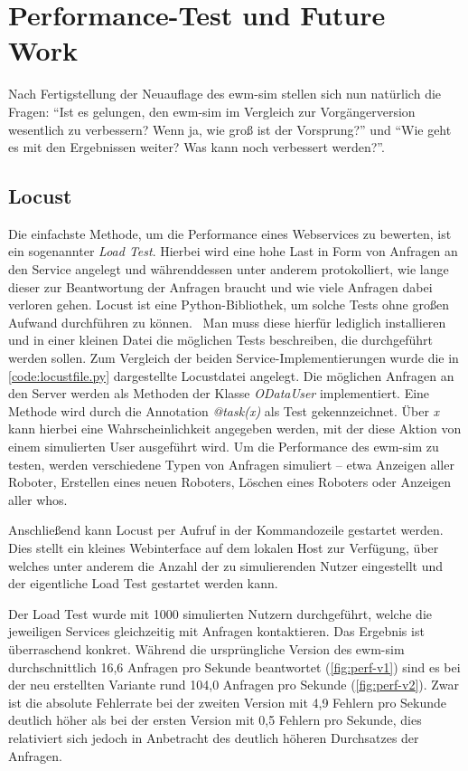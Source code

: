 \chapter{Performance-Test und Future Work}
Nach Fertigstellung der Neuauflage des \ac{ewm-sim} stellen sich nun natürlich die Fragen: \enquote{Ist es gelungen, den \ac{ewm-sim} im Vergleich zur Vorgängerversion wesentlich zu verbessern? Wenn ja, wie groß ist der Vorsprung?} und \enquote{Wie geht es mit den Ergebnissen weiter? Was kann noch verbessert werden?}.

\section{Locust}
Die einfachste Methode, um die Performance eines Webservices zu bewerten, ist ein sogenannter \emph{Load Test}.
Hierbei wird eine hohe Last in Form von Anfragen an den Service angelegt und währenddessen unter anderem protokolliert, wie lange dieser zur Beantwortung der Anfragen braucht und wie viele Anfragen dabei verloren gehen.
Locust ist eine Python-Bibliothek, um solche Tests ohne großen Aufwand durchführen zu können.~\cite{locust, locust-doc}
Man muss diese hierfür lediglich installieren und in einer kleinen Datei die möglichen Tests beschreiben, die durchgeführt werden sollen.
Zum Vergleich der beiden Service-Implementierungen wurde die in \autoref{code:locustfile.py} dargestellte Locustdatei angelegt.
Die möglichen Anfragen an den Server werden als Methoden der Klasse \emph{ODataUser} implementiert.
Eine Methode wird durch die Annotation \emph{@task(x)} als Test gekennzeichnet.
Über \emph{x} kann hierbei eine Wahrscheinlichkeit angegeben werden, mit der diese Aktion von einem simulierten User ausgeführt wird.
Um die Performance des \ac{ewm-sim} zu testen, werden verschiedene Typen von Anfragen simuliert -- etwa Anzeigen aller Roboter, Erstellen eines neuen Roboters, Löschen eines Roboters oder Anzeigen aller \ac{who}s.


Anschließend kann Locust per Aufruf in der Kommandozeile gestartet werden.
Dies stellt ein kleines Webinterface auf dem lokalen Host zur Verfügung, über welches unter anderem die Anzahl der zu simulierenden Nutzer eingestellt und der eigentliche Load Test gestartet werden kann.

Der Load Test wurde mit 1000 simulierten Nutzern durchgeführt, welche die jeweiligen Services gleichzeitig mit Anfragen kontaktieren.
Das Ergebnis ist überraschend konkret.
Während die ursprüngliche Version des \ac{ewm-sim} durchschnittlich 16,6 Anfragen pro Sekunde beantwortet (\autoref{fig:perf-v1}) sind es bei der neu erstellten Variante rund 104,0 Anfragen pro Sekunde (\autoref{fig:perf-v2}).
Zwar ist die absolute Fehlerrate bei der zweiten Version mit 4,9 Fehlern pro Sekunde deutlich höher als bei der ersten Version mit 0,5 Fehlern pro Sekunde, dies relativiert sich jedoch in Anbetracht des deutlich höheren Durchsatzes der Anfragen.

